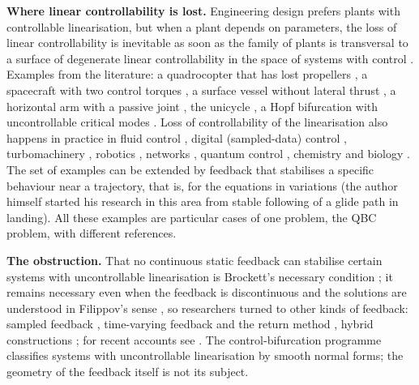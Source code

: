 \documentclass[11pt,reqno]{amsart}
\theoremstyle{plain}
\theoremstyle{remark}
\theoremstyle{definition}
\begin{document}
\medskip
\noindent\textbf{Where linear controllability is lost.}
Engineering design prefers plants with controllable linearisation, but when a plant depends on parameters, the
loss of linear controllability is inevitable as soon as the family of plants is transversal to a surface of
degenerate linear controllability in the space of systems with control \cite{Shosh1990}. Examples from the
literature: a quadrocopter that has lost propellers \cite{MuellerDAndrea2014,MuellerDAndrea2016}, a spacecraft
with two control torques \cite{BrewerTsiotras2022}, a surface vessel without lateral thrust
\cite{Reyhanoglu1997,PanPengLvTian2025}, a horizontal arm with a passive joint \cite{DeLucaMattoneOriolo2000},
the unicycle \cite{dAndreaNovelCoronPerruquetti2020}, a Hopf bifurcation with uncontrollable critical modes
\cite{AbedFu1986}. Loss of controllability of the linearisation also happens in practice in fluid control \cite{CoronLissy2014}, digital
(sampled-data) control \cite{YangWangWang2024}, turbomachinery \cite{LiawAbed1996}, robotics \cite{Sampei2018}, networks \cite{JiangLai2019},
quantum control \cite{Bournissou2023}, chemistry \cite{LeBalch2019} and biology \cite{CorneliusKathMotter2013}. The set of
examples can be extended by feedback that stabilises a specific behaviour near a trajectory, that is, for the
equations in variations (the author himself started his research in this area from stable following of a glide
path in landing). All these examples are particular cases of one problem, the QBC problem, with different
references.

\medskip
\noindent\textbf{The obstruction.}
That no continuous static feedback can stabilise certain systems with uncontrollable linearisation is Brockett's
necessary condition \cite{Brockett1983}; it remains necessary even when the feedback is discontinuous and the solutions are understood in
Filippov's sense \cite{Ryan1994}, so researchers turned to
other kinds of feedback: sampled feedback \cite{CLSS1997}, time-varying feedback and the
return method \cite{Coron2007}, hybrid constructions \cite{GoebelSanfeliceTeel2012}; for recent accounts see
\cite{KvalheimKoditschek2022,JongeneelMoulay2023}. The control-bifurcation programme \cite{KrenerKangChang2004}
classifies systems with uncontrollable linearisation by smooth normal forms; the geometry of the feedback itself is not
its subject.
\end{document}
